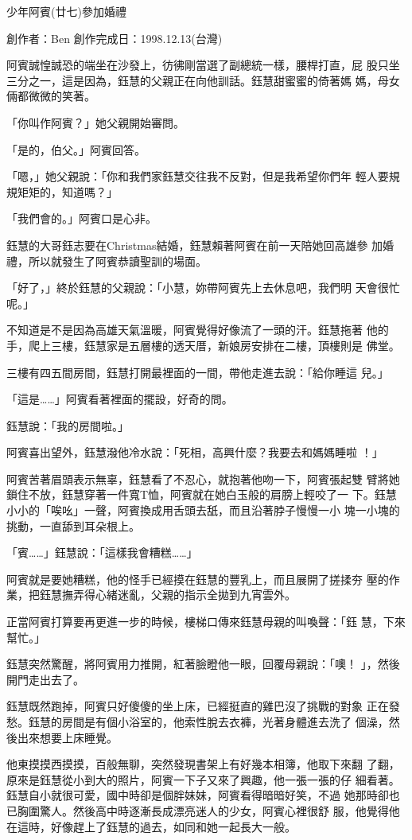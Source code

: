 



少年阿賓(廿七)參加婚禮

創作者：Ben
創作完成日：1998.12.13(台灣)


阿賓誠惶誠恐的端坐在沙發上，彷彿剛當選了副總統一樣，腰桿打直，屁
股只坐三分之一，這是因為，鈺慧的父親正在向他訓話。鈺慧甜蜜蜜的倚著媽
媽，母女倆都微微的笑著。

「你叫作阿賓？」她父親開始審問。

「是的，伯父。」阿賓回答。

「嗯，」她父親說：「你和我們家鈺慧交往我不反對，但是我希望你們年
輕人要規規矩矩的，知道嗎？」

「我們會的。」阿賓口是心非。

鈺慧的大哥鈺志要在Christmas結婚，鈺慧賴著阿賓在前一天陪她回高雄參
加婚禮，所以就發生了阿賓恭讀聖訓的場面。

「好了，」終於鈺慧的父親說：「小慧，妳帶阿賓先上去休息吧，我們明
天會很忙呢。」

不知道是不是因為高雄天氣溫暖，阿賓覺得好像流了一頭的汗。鈺慧拖著
他的手，爬上三樓，鈺慧家是五層樓的透天厝，新娘房安排在二樓，頂樓則是
佛堂。

三樓有四五間房間，鈺慧打開最裡面的一間，帶他走進去說：「給你睡這
兒。」

「這是……」阿賓看著裡面的擺設，好奇的問。

鈺慧說：「我的房間啦。」

阿賓喜出望外，鈺慧潑他冷水說：「死相，高興什麼？我要去和媽媽睡啦
！」

阿賓苦著眉頭表示無辜，鈺慧看了不忍心，就抱著他吻一下，阿賓張起雙
臂將她鎖住不放，鈺慧穿著一件寬T恤，阿賓就在她白玉般的肩膀上輕咬了一
下。鈺慧小小的「唉吆」一聲，阿賓換成用舌頭去舐，而且沿著脖子慢慢一小
塊一小塊的挑動，一直舔到耳朵根上。

「賓……」鈺慧說：「這樣我會糟糕……」

阿賓就是要她糟糕，他的怪手已經摸在鈺慧的豐乳上，而且展開了搓揉夯
壓的作業，把鈺慧撫弄得心緒迷亂，父親的指示全拋到九宵雲外。

正當阿賓打算要再更進一步的時候，樓梯口傳來鈺慧母親的叫喚聲：「鈺
慧，下來幫忙。」

鈺慧突然驚醒，將阿賓用力推開，紅著臉瞪他一眼，回覆母親說：「噢！
」，然後開門走出去了。

鈺慧既然跑掉，阿賓只好傻傻的坐上床，已經挺直的雞巴沒了挑戰的對象
正在發愁。鈺慧的房間是有個小浴室的，他索性脫去衣褲，光著身體進去洗了
個澡，然後出來想要上床睡覺。

他東摸摸西摸摸，百般無聊，突然發現書架上有好幾本相簿，他取下來翻
了翻，原來是鈺慧從小到大的照片，阿賓一下子又來了興趣，他一張一張的仔
細看著。鈺慧自小就很可愛，國中時卻是個胖妹妹，阿賓看得暗暗好笑，不過
她那時卻也已胸圍驚人。然後高中時逐漸長成漂亮迷人的少女，阿賓心裡很舒
服，他覺得他在這時，好像趕上了鈺慧的過去，如同和她一起長大一般。

